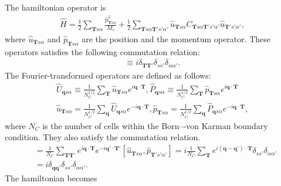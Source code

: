 \documentclass{article}
\begin{document}
The hamiltonian operator is
\begin{align}
    \hat{H} = \frac{1}{2}\sum_{\textbf{T}s\alpha}\frac{\hat{p}_{\textbf{T}s\alpha}^2}{M_s} 
    + \frac{1}{2}\sum_{\textbf{T}s\alpha \textbf{T}'s'\alpha'} \hat{u}_{\textbf{T}s\alpha} 
    C_{\textbf{T}s\alpha \textbf{T}'s'\alpha'} \hat{u}_{\textbf{T}'s'\alpha'},
\end{align}
where $\hat{u}_{\textbf{T}s\alpha}$ and $\hat{p}_{\textbf{T}s\alpha}$ are the position and the momentum operator.
These operators satisfies the following commutation relation:
\begin{align}
    [\hat{u}_{\textbf{T}s\alpha}, \hat{p}_{\textbf{T}'s'\alpha'}] \equiv i \delta_{\textbf{T}\textbf{T}'}\delta_{s s'}\delta_{\alpha \alpha'}.
\end{align}
The Fourier-transformed operators are defined as follows:
\begin{align}
    \hat{U}_{\textbf{q}s\alpha} \equiv \frac{1}{N_C^{1/2}} \sum_{\textbf{T}} \hat{u}_{\textbf{T}s\alpha} e^{i\textbf{q}\cdot\textbf{T}}
    ,
    \hat{P}_{\textbf{q}s\alpha} \equiv \frac{1}{N_C^{1/2}} \sum_{\textbf{T}} \hat{p}_{\textbf{T}s\alpha} e^{i\textbf{q}\cdot\textbf{T}}
    \\
    \hat{u}_{\textbf{T}s\alpha} = \frac{1}{N_C^{1/2}} \sum_{\textbf{q}} \hat{U}_{\textbf{q}s\alpha} e^{-i\textbf{q}\cdot\textbf{T}}
    ,
    \hat{p}_{\textbf{T}s\alpha} = \frac{1}{N_C^{1/2}} \sum_{\textbf{q}} \hat{P}_{\textbf{q}s\alpha} e^{-i\textbf{q}\cdot\textbf{T}},
\end{align}
where $N_C$ is the number of cells within the Born–-von Karman boundary condition.
They also satisfy the commutation relation.
\begin{align}
    [\hat{U}_{\textbf{q}s\alpha}, \hat{P}_{\textbf{q}'s'\alpha'}^\dagger] 
    &= \frac{1}{N_C}\sum_{\textbf{T}\textbf{T}'} e^{i\textbf{q}\cdot\textbf{T}}e^{-i\textbf{q}'\cdot\textbf{T}'}
    [\hat{u}_{\textbf{T}s\alpha}, \hat{p}_{\textbf{T}'s'\alpha'}]
    =
    i \frac{1}{N_C}\sum_{\textbf{T}} e^{i(\textbf{q}-\textbf{q}')\cdot\textbf{T}}
    \delta_{s s'}\delta_{\alpha \alpha'}
    \\
    &=i \delta_{\textbf{q}\textbf{q}'}\delta_{s s'}\delta_{\alpha \alpha'} .
\end{align}
The hamiltonian becomes
\end{document}
